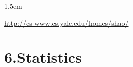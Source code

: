 \documentclass[12pt,twoside]{article}
\begin{document}
\begin{mddefinitions}%


\begin{mdbmarginx}{}{}{}{1.5em}%
\begin{mddefdata}%
\href{http://cs-www.cs.yale.edu/homes/shao/}{{\ttfamily http://\hspace{0pt}cs-\hspace{0pt}www.\hspace{0pt}cs.\hspace{0pt}yale.\hspace{0pt}edu/\hspace{0pt}homes/\hspace{0pt}shao/\hspace{0pt}}}%
\end{mddefdata}%
\end{mdbmarginx}%
\end{mddefinitions}%

\section{6.\hspace*{0.5em}Statistics}%
\end{document}
